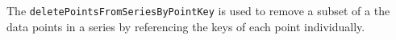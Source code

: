 The \verb+deletePointsFromSeriesByPointKey+ is used to remove a subset of a the data points
in a series by referencing the keys of each point individually.
